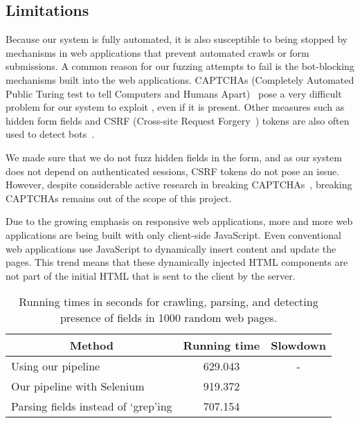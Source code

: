 \subsection[Limitations]{Limitations}

\label{limitations}
		Because our system is fully automated, it is also susceptible to being stopped by mechanisms in web applications that prevent automated crawls or form submissions. A common reason for our fuzzing attempts to fail is the bot-blocking mechanisms built into the web applications. CAPTCHAs (Completely Automated Public Turing test to tell Computers and Humans Apart)~\cite{captchas2} pose a very difficult problem for our system to exploit \ehi, even if it is present.
		Other measures such as hidden form fields and CSRF (Cross-site Request Forgery~\cite{csrf}) tokens are also often used to detect bots~\cite{captchas3,captchas2}.

		We made sure that we do not fuzz hidden fields in the form, and as our system does not depend on authenticated sessions, CSRF tokens do not pose an issue. However, despite considerable active research in breaking CAPTCHAs~\cite{captchas2,captchas}, breaking CAPTCHAs remains out of the scope of this project. 
		
	   Due to the growing emphasis on responsive web applications, more and more web applications are being built with only client-side JavaScript. Even conventional web applications use JavaScript to dynamically insert content and update the pages. This trend means that these dynamically injected HTML components are not part of the initial HTML that is sent to the client by the server.

		\begin{table}[tb]
			\centering
			\scriptsize
			\begin{tabular}{|p{4cm}|c|c|}
				\hline
				\multicolumn{1}{|c}{\textbf{Method}} &
				\multicolumn{1}{|c|}{\textbf{Running time}} &
				\multicolumn{1}{|c|}{\textbf{Slowdown}}
				\\
				\hline
				\centering Using our pipeline & 629.043 & - \\
				\hline
				\centering Our pipeline with Selenium & 919.372 & \slowSelenium \\
				\hline				
				\centering Parsing \email fields instead of `grep'ing& 707.154 & \slowParse \\								
				\hline
			\end{tabular}
			\caption[\titlecap{}]{Running times in seconds for crawling, parsing, and detecting presence of \email fields in 1000 random web pages.}
            
			\label{tab:perf}
        \end{table}

